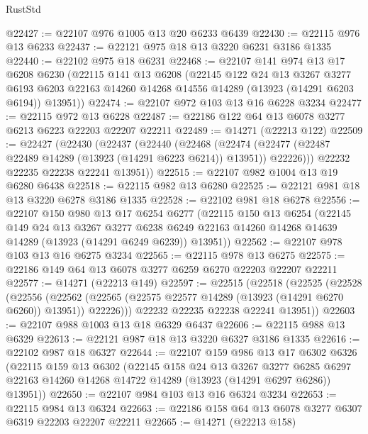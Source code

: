 \begin{lexlean}{RustStd}
\begin{coremodule}
@22427 := @22107 @976 @1005 @13 @20 @6233 @6439
@22430 := @22115 @976 @13 @6233
@22437 := @22121 @975 @18 @13 @3220 @6231 @3186 @1335
@22440 := @22102 @975 @18 @6231
@22468 := @22107
    @141
    @974
    @13
    @17
    @6208
    @6230
    (@22115
      @141
      @13
      @6208
      (@22145
        @122
        @24
        @13
        @3267
        @3277
        @6193
        @6203
        @22163
        @14260
        @14268
        @14556
        @14289
        (@13923 (@14291 @6203 @6194))
        @13951))
@22474 := @22107 @972 @103 @13 @16 @6228 @3234
@22477 := @22115 @972 @13 @6228
@22487 := @22186 @122 @64 @13 @6078 @3277 @6213 @6223 @22203 @22207 @22211
@22489 := @14271 (@22213 @122)
@22509 := @22427
    (@22430
      (@22437
        (@22440
          (@22468
            (@22474 (@22477 (@22487 @22489 @14289 (@13923 (@14291 @6223 @6214)) @13951)) @22226)))
        @22232
        @22235
        @22238
        @22241
        @13951))
@22515 := @22107 @982 @1004 @13 @19 @6280 @6438
@22518 := @22115 @982 @13 @6280
@22525 := @22121 @981 @18 @13 @3220 @6278 @3186 @1335
@22528 := @22102 @981 @18 @6278
@22556 := @22107
    @150
    @980
    @13
    @17
    @6254
    @6277
    (@22115
      @150
      @13
      @6254
      (@22145
        @149
        @24
        @13
        @3267
        @3277
        @6238
        @6249
        @22163
        @14260
        @14268
        @14639
        @14289
        (@13923 (@14291 @6249 @6239))
        @13951))
@22562 := @22107 @978 @103 @13 @16 @6275 @3234
@22565 := @22115 @978 @13 @6275
@22575 := @22186 @149 @64 @13 @6078 @3277 @6259 @6270 @22203 @22207 @22211
@22577 := @14271 (@22213 @149)
@22597 := @22515
    (@22518
      (@22525
        (@22528
          (@22556
            (@22562 (@22565 (@22575 @22577 @14289 (@13923 (@14291 @6270 @6260)) @13951)) @22226)))
        @22232
        @22235
        @22238
        @22241
        @13951))
@22603 := @22107 @988 @1003 @13 @18 @6329 @6437
@22606 := @22115 @988 @13 @6329
@22613 := @22121 @987 @18 @13 @3220 @6327 @3186 @1335
@22616 := @22102 @987 @18 @6327
@22644 := @22107
    @159
    @986
    @13
    @17
    @6302
    @6326
    (@22115
      @159
      @13
      @6302
      (@22145
        @158
        @24
        @13
        @3267
        @3277
        @6285
        @6297
        @22163
        @14260
        @14268
        @14722
        @14289
        (@13923 (@14291 @6297 @6286))
        @13951))
@22650 := @22107 @984 @103 @13 @16 @6324 @3234
@22653 := @22115 @984 @13 @6324
@22663 := @22186 @158 @64 @13 @6078 @3277 @6307 @6319 @22203 @22207 @22211
@22665 := @14271 (@22213 @158)

\end{coremodule}
\end{lexlean}
